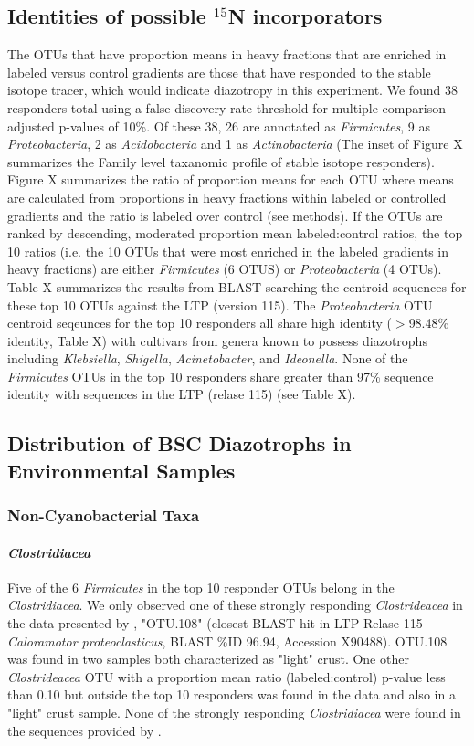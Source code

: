 \subsection{Identities of possible $^{15}$N incorporators}
The OTUs that have proportion means in heavy fractions that are enriched in labeled versus control gradients are those that have responded to the stable isotope tracer, which would indicate diazotropy in this experiment. We found 38 responders total using a false discovery rate threshold for multiple comparison adjusted p-values of 10\%. Of these 38, 26 are annotated as \textit{Firmicutes}, 9 as \textit{Proteobacteria}, 2 as \textit{Acidobacteria} and 1 as \textit{Actinobacteria} (The inset of Figure X summarizes the Family level taxanomic profile of stable isotope responders). Figure X summarizes the ratio of proportion means for each OTU where means are calculated from proportions in heavy fractions within labeled or controlled gradients and the ratio is labeled over control (see methods). If the OTUs are ranked by descending, moderated proportion mean labeled:control ratios, the top 10 ratios (i.e. the 10 OTUs that were most enriched in the labeled gradients in heavy fractions) are either \textit{Firmicutes} (6 OTUS) or \textit{Proteobacteria} (4 OTUs). Table X summarizes the results from BLAST searching the centroid sequences for these top 10 OTUs against the LTP (version 115). The \textit{Proteobacteria} OTU centroid seqeunces for the top 10 responders all share high identity ($>$98.48\% identity, Table X) with cultivars from genera known to possess diazotrophs including \textit{Klebsiella}, \textit{Shigella}, \textit{Acinetobacter}, and \textit{Ideonella}. None of the \textit{Firmicutes} OTUs in the top 10 responders share greater than 97\% sequence identity with sequences in the LTP (relase 115) (see Table X).

\subsection{Distribution of BSC Diazotrophs in Environmental Samples}
\subsubsection{Non-Cyanobacterial Taxa}
\paragraph{\textit{Clostridiacea}}
Five of the 6 \textit{Firmicutes} in the top 10 responder OTUs belong in the \textit{Clostridiacea}. We only observed one of these strongly responding \textit{Clostrideacea} in the data presented by \citet{Garcia_Pichel_2013}, "OTU.108" (closest BLAST hit in LTP Relase 115 -- \textit{Caloramotor proteoclasticus}, BLAST \%ID 96.94, Accession X90488). OTU.108 was found in two samples both characterized as "light" crust. One other \textit{Clostrideacea} OTU with a proportion mean ratio (labeled:control) p-value less than 0.10 but outside the top 10 responders was found in the \citet{Garcia_Pichel_2013} data and also in a "light" crust sample. None of the strongly responding \textit{Clostridiacea} were found in the sequences provided by \citet{Steven_2013}.

